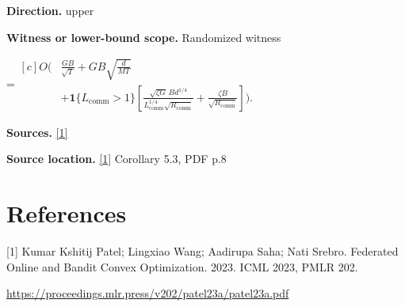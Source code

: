 \documentclass[10pt,a4paper]{article}
\newcommand{\AtlasMath}[1]{\par\begingroup\centering\setbox0=\hbox{$\displaystyle #1$}\ifdim\wd0>1.4\linewidth\typeout{ATLAS WIDE FORMULA: \the\wd0}\fi\ifdim\wd0>\linewidth\resizebox{\linewidth}{!}{\box0}\else\box0\fi\par\endgroup}
\begin{document}
\textbf{Direction.} upper

\textbf{Witness or lower-bound scope.} Randomized witness

\AtlasMath{\begin{aligned}[c]O\!\Bigg(&\frac{GB}{\sqrt T}+GB\sqrt{\frac d{MT}}\\ &+\mathbf1\{L_{\mathrm{comm}}>1\}\left[\frac{\sqrt{\zeta G}\,B d^{1/4}}{L_{\mathrm{comm}}^{1/4}\sqrt{R_{\mathrm{comm}}}}+\frac{\zeta B}{\sqrt{R_{\mathrm{comm}}}}\right]\Bigg).\end{aligned}}
\textbf{Sources.} \href{https://proceedings.mlr.press/v202/patel23a/patel23a.pdf}{[1]}

\textbf{Source location.} \href{https://proceedings.mlr.press/v202/patel23a/patel23a.pdf}{[1]} Corollary 5.3, PDF p.8

\section{References}
[1] Kumar Kshitij Patel; Lingxiao Wang; Aadirupa Saha; Nati Srebro. Federated Online and Bandit Convex Optimization. 2023. ICML 2023, PMLR 202.

\url{https://proceedings.mlr.press/v202/patel23a/patel23a.pdf}
\end{document}
